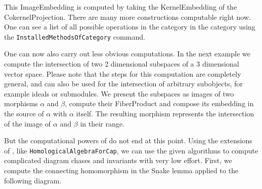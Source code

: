 This \textrm{ImageEmbedding} is computed by taking the \textrm{KernelEmbedding} of the \textrm{CokernelProjection}.
There are many more constructions computable right now. One can see a list of all possible operations in the category
in the category using the \texttt{InstalledMethodsOfCategory} command.

\begin{small}

\end{small}

One can now also carry out less obvious computations. In the next example we compute the intersection of two 2 dimensional
subspaces of a 3 dimensional vector space. Please note that the steps for this computation are completely general, and
can also be used for the intersection of arbitrary subobjects, for example ideals or submodules. We present the
subspaces as images of two morphisms $\alpha$ and $\beta$, compute their \textrm{FiberProduct} and compose its embedding
in the source of $\alpha$ with $\alpha$ itself. The resulting morphism represents the intersection of the image of $\alpha$
and $\beta$ in their range.

\begin{small}
 
\end{small}

But the computational powers of \CapPkg do not end at this point. Using the extensions of \CapPkg, like \texttt{HomologicalAlgebraForCap},
we can use the given algorithms to compute complicated diagram chases and invariants with very low effort. First,
we compute the connecting homomorphism in the Snake lemma applied to the following diagram.

